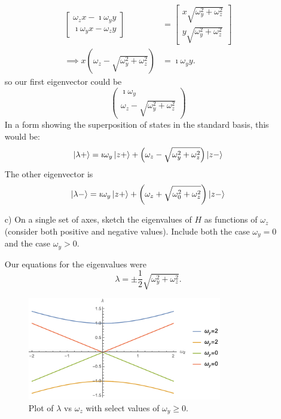 \documentclass[a4paper,twoside]{article}
\begin{document}
\begin{itemize}
\begin{tcolorbox}[breakable]
    \begin{align*}
        \begin{bmatrix} \omega_z x - \imath\omega_y y \\ \imath\omega_y x -\omega_z y \end{bmatrix} &= \begin{bmatrix} x\sqrt{\omega_y^2 + \omega_z^2} \\ y\sqrt{\omega_y^2+\omega_z^2} \end{bmatrix}\\
        \implies x\left( \omega_z - \sqrt{\omega_y^2 + \omega_z^2} \right) &= \imath\omega_y y
    .\end{align*}
    so our first eigenvector could be
    \begin{equation}
        \begin{pmatrix} \imath\omega_y \\ \omega_z-\sqrt{\omega_y^2+\omega_z^2}  \end{pmatrix} 
    \end{equation}
    In a form showing the superposition of states in the standard basis, this would be:
    \begin{equation}
        \ket{\lambda+} = \imath\omega_y\ket{z+} + \left(\omega_z-\sqrt{\omega_y^2+\omega_z^2}\right)\ket{z-}
    \end{equation}
    The other eigenvector is
    \begin{equation}
        \ket{\lambda-} =  \imath\omega_y \ket{z+} + \left( \omega_z + \sqrt{\omega_0^2 + \omega_z^2}  \right)\ket{z-}
    \end{equation}
\end{tcolorbox}
    \item[c)] On a single set of axes, sketch the eigenvalues of $H$ as functions of $\omega_z$ (consider both positive and negative values). Include both the case $\omega_y = 0$ and the case $\omega_y > 0$.
\begin{tcolorbox}[breakable]
    Our equations for the eigenvalues were
    \begin{equation}
        \lambda = \pm\frac{1}{2}\sqrt{\omega_y^2+\omega_z^2}.
    \end{equation}
\end{tcolorbox}
\begin{figure}[h]
    \centering
    \includegraphics[width=0.8\textwidth]{plot_hw3_2c.png}
    \caption{Plot of $\lambda$ vs $\omega_z$ with select values of $\omega_y\ge 0$.}
    \label{fig:plot2c}
\end{figure}


\end{itemize}
\end{document}
